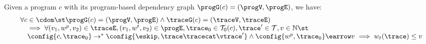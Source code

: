 \begin{thm}
    \label{thm:edgeweight_soundness}
  Given a program ${c}$ with its program-based dependency graph 
  $\progG(c) = (\progV, \progE)$,
  we have:
    \[
		\begin{array}{l}
			\forall c \in \cdom 
			 \st 
			 \progG({c}) = (\progV, \progE)
			\land 
			\traceG({c}) = (\traceV, \traceE)
			\\ \quad
			\implies
			\forall (v_1, w^p, v_2) \in \traceE,
			(v_1, w^t, v_2) \in \progE, 
			\trace_0 \in \mathcal{T}_0(c), 
			\trace' \in \mathcal{T}, v \in \mathbb{N} \st
			\\ \quad
			\config{{c}, \trace_0} \to^{*} \config{\eskip, \trace\tracecat\vtrace'} 
			\land 
			\config{w^{p}, \trace_0} \earrow v
			\implies
			w_{t}(\trace) \leq v
		\end{array}
		\]
  \end{thm}
%
